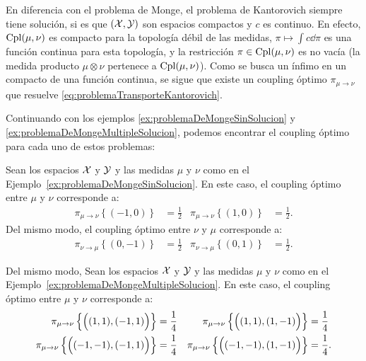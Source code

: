 {{{			En diferencia con el problema de Monge, el problema de Kantorovich siempre tiene solución, si es que $(\mathcal{X}, \mathcal{Y})$ son espacios compactos y $c$ es continuo. En efecto, $\operatorname{Cpl}(\mu, \nu)$ es compacto para la topología débil de las medidas,  $\pi \mapsto \int c\dd{\pi}$ es una función continua para esta topología, y la restricción $\pi\in\operatorname{Cpl}(\mu, \nu)$ es no vacía (la medida producto $\mu \otimes \nu$ pertenece a $\operatorname{Cpl}(\mu, \nu)$). Como se busca un ínfimo en un compacto de una función continua, se sigue que existe un coupling óptimo $\pi_{\mu \to \nu}$ que resuelve \eqref{eq:problemaTransporteKantorovich}.

			Continuando con los ejemplos \ref*{ex:problemaDeMongeSinSolucion} y \ref*{ex:problemaDeMongeMultipleSolucion}, podemos encontrar el coupling óptimo para cada uno de estos problemas:

			\begin{example}
				Sean los espacios $\mathcal{X}$ y $\mathcal{Y}$ y las medidas $\mu$ y $\nu$ como en el Ejemplo~\ref*{ex:problemaDeMongeSinSolucion}. En este caso, el coupling óptimo entre $\mu$ y $\nu$ corresponde a:
				\begin{align*}
					\pi_{\mu \to \nu}\left\{ (-1, 0) \right\} & = \frac{1}{2} & \pi_{\mu \to \nu}\left\{ (1, 0) \right\} & = \frac{1}{2}.
				\end{align*}
				Del mismo modo, el coupling óptimo entre $\nu$ y $\mu$ corresponde a:
				\begin{align*}
					\pi_{\nu \to \mu}\left\{ (0, -1) \right\} & = \frac{1}{2} & \pi_{\nu \to \mu}\left\{ (0, 1) \right\} & = \frac{1}{2}.
				\end{align*}

			\end{example}

			\begin{example}
				Del mismo modo, Sean los espacios $\mathcal{X}$ y $\mathcal{Y}$ y las medidas $\mu$ y $\nu$ como en el Ejemplo~\ref*{ex:problemaDeMongeMultipleSolucion}. En este caso, el coupling óptimo entre $\mu$ y $\nu$ corresponde a:
				\begin{align*}
					\pi_{\mu \to \nu}\left\{ \qty\Big((1, 1), (-1, 1)) \right\}   & = \frac{1}{4} & \pi_{\mu \to \nu}\left\{ \qty\Big((1, 1), (1, -1)) \right\}   & = \frac{1}{4}  \\
					\pi_{\mu \to \nu}\left\{ \qty\Big((-1, -1), (-1, 1)) \right\} & = \frac{1}{4} & \pi_{\mu \to \nu}\left\{ \qty\Big((-1, -1), (1, -1)) \right\} & = \frac{1}{4}.
				\end{align*}


\end{example}}}}
